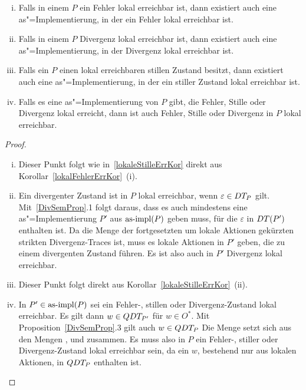 \begin{Kor}\mbox{}
  \label{lokalDivErrKor}
  \begin{enumerate}[(i)]
    \item Falls in einem \MEIO{} $P$ ein Fehler lokal erreichbar ist, dann
      existiert auch eine as"=Implementierung, in der ein Fehler lokal
      erreichbar ist.
    \item Falls in einem \MEIO{} $P$ Divergenz lokal erreichbar ist, dann
      existiert auch eine as"=Implementierung, in der Divergenz lokal
      erreichbar ist.
    \item Falls ein \MEIO{} $P$ einen lokal erreichbaren stillen Zustand
      besitzt, dann existiert auch eine as"=Implementierung, in der ein stiller
      Zustand lokal erreichbar ist.
    \item Falls es eine as"=Implementierung von $P$ gibt, die Fehler, Stille
      oder Divergenz lokal erreicht, dann ist auch Fehler, Stille oder
      Divergenz in $P$ lokal erreichbar.
  \end{enumerate}
\end{Kor}
\begin{proof}\mbox{}
  \begin{enumerate}[(i)]
    \item Dieser Punkt folgt wie in~\ref{lokaleStilleErrKor} direkt aus
      Korollar~\ref{lokalFehlerErrKor}~(i).
    \item Ein divergenter Zustand ist in $P$ lokal erreichbar, wenn
      $\varepsilon \in DT _P$ gilt. Mit~\ref{DivSemProp}.1 folgt daraus, dass
      es auch mindestens eine as"=Implementierung $P'$ aus $\mathrm{as}\text{-}\mathrm{impl} (P)$ geben
      muss, für die $\varepsilon$ in $DT (P')$ enthalten ist. Da \DT{} die
      Menge der fortgesetzten um lokale Aktionen gekürzten strikten
      Divergenz-Traces ist, muss es lokale Aktionen in $P'$ geben, die zu einem
      divergenten Zustand führen. Es ist also auch in $P'$ Divergenz lokal
      erreichbar.
    \item Dieser Punkt folgt direkt aus Korollar~\ref{lokaleStilleErrKor}~(ii).
    \item In $P'\in\mathrm{as}\text{-}\mathrm{impl} (P)$ sei ein Fehler-, stillen oder Divergenz-Zustand
      lokal erreichbar. Es gilt dann $w\in QDT _{P'}$ für $w\in O^*$. Mit
      Proposition~\ref{DivSemProp}.3 gilt auch $w\in QDT _P$ Die Menge \QDT{}
      setzt sich aus den Mengen \ET{}, \StQT{} und \DT{} zusammen. Es muss also
      in $P$ ein Fehler-, stiller oder Divergenz-Zustand lokal erreichbar sein,
      da ein $w$, bestehend nur aus lokalen Aktionen, in $QDT _P$ enthalten
      ist.
  \end{enumerate}
\end{proof}

